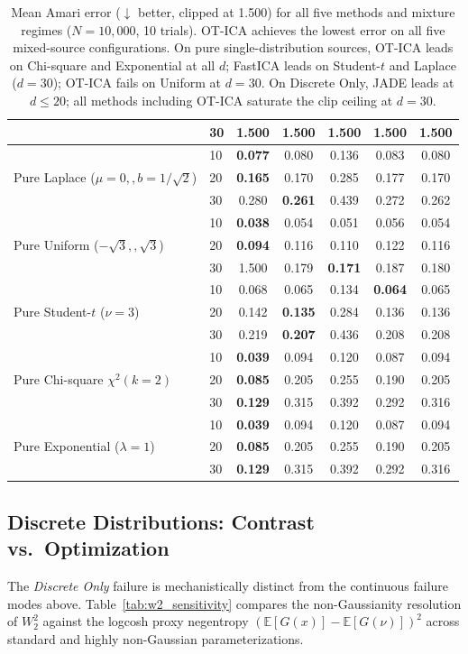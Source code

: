 \documentclass[accepted]{tpm2026} %
\begin{document}
\begin{table}[htbp]
\begin{tabular}{llccccc}
 & 30 & 1.500 & 1.500 & 1.500 & 1.500 & 1.500 \\
\midrule
\multirow{3}{*}{Pure Laplace ($\mu=0,, b=1/\sqrt{2}$)}
 & 10 & \textbf{0.077} & 0.080 & 0.136 & 0.083 & 0.080 \\
 & 20 & \textbf{0.165} & 0.170 & 0.285 & 0.177 & 0.170 \\
 & 30 & 0.280 & \textbf{0.261} & 0.439 & 0.272 & 0.262 \\
\midrule
\multirow{3}{*}{Pure Uniform ($-\sqrt{3},, \sqrt{3}$)}
 & 10 & \textbf{0.038} & 0.054 & 0.051 & 0.056 & 0.054 \\
 & 20 & \textbf{0.094} & 0.116 & 0.110 & 0.122 & 0.116 \\
 & 30 & 1.500 & 0.179 & \textbf{0.171} & 0.187 & 0.180 \\
\midrule
\multirow{3}{*}{Pure Student-$t$ ($\nu=3$)}
 & 10 & 0.068 & 0.065 & 0.134 & \textbf{0.064} & 0.065 \\
 & 20 & 0.142 & \textbf{0.135} & 0.284 & 0.136 & 0.136 \\
 & 30 & 0.219 & \textbf{0.207} & 0.436 & 0.208 & 0.208 \\
\midrule
\multirow{3}{*}{Pure Chi-square $\chi^2(k=2)$}
 & 10 & \textbf{0.039} & 0.094 & 0.120 & 0.087 & 0.094 \\
 & 20 & \textbf{0.085} & 0.205 & 0.255 & 0.190 & 0.205 \\
 & 30 & \textbf{0.129} & 0.315 & 0.392 & 0.292 & 0.316 \\
\midrule
\multirow{3}{*}{Pure Exponential ($\lambda=1$)}
 & 10 & \textbf{0.039} & 0.094 & 0.120 & 0.087 & 0.094 \\
 & 20 & \textbf{0.085} & 0.205 & 0.255 & 0.190 & 0.205 \\
 & 30 & \textbf{0.129} & 0.315 & 0.392 & 0.292 & 0.316 \\
\bottomrule
\end{tabular}
\caption{Mean Amari error ($\downarrow$ better, clipped at 1.500) for all five methods and mixture regimes ($N=10{,}000$, 10 trials). OT-ICA achieves the lowest error on all five mixed-source configurations. On pure single-distribution sources, OT-ICA leads on Chi-square and Exponential at all $d$; FastICA leads on Student-$t$ and Laplace ($d=30$); OT-ICA fails on Uniform at $d=30$. On Discrete Only, JADE leads at $d \le 20$; all methods including OT-ICA saturate the clip ceiling at $d=30$.}
\label{tab:full_amari_results}
\end{table}

\subsection{Discrete Distributions: Contrast vs.\ Optimization}
\label{app:discrete_contrast}
The \textit{Discrete Only} failure is mechanistically distinct from the continuous failure modes above. Table~\ref{tab:w2_sensitivity} compares
the non-Gaussianity resolution of $W_2^2$ against the logcosh proxy negentropy $(\mathbb{E}[G(x)]-\mathbb{E}[G(\nu)])^2$ across standard and highly non-Gaussian parameterizations.
\end{document}
